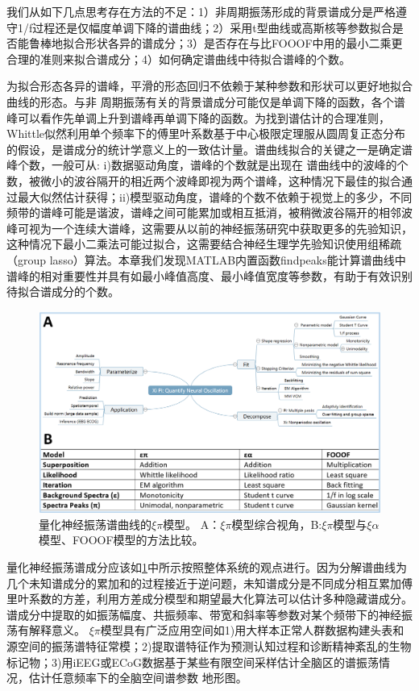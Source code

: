 我们从如下几点思考存在方法的不足：1）非周期振荡形成的背景谱成分是严格遵守1/f过程还是仅幅度单调下降的谱曲线；2）采用t型曲线或高斯核等参数拟合是否能鲁棒地拟合形状各异的谱成分；3）是否存在与比FOOOF中用的最小二乘更合理的准则来拟合谱成分；4）如何确定谱曲线中待拟合谱峰的个数。

为拟合形态各异的谱峰，平滑的形态回归不依赖于某种参数和形状可以更好地拟合曲线的形态。与非
周期振荡有关的背景谱成分可能仅是单调下降的函数，各个谱峰可以看作先单调上升到谱峰再单调下降的函数。为找到谱估计的合理准则，Whittle似然利用单个频率下的傅里叶系数基于中心极限定理服从圆周复正态分布的假设，是谱成分的统计学意义上的一致估计量。谱曲线拟合的关键之一是确定谱峰个数，一般可从: i)数据驱动角度，谱峰的个数就是出现在
谱曲线中的波峰的个数，被微小的波谷隔开的相近两个波峰即视为两个谱峰，这种情况下最佳的拟合通过最大似然估计获得；ii)模型驱动角度，谱峰的个数不依赖于视觉上的多少，不同频带的谱峰可能是谐波，谱峰之间可能累加或相互抵消，被稍微波谷隔开的相邻波峰可视为一个连续大谱峰，这需要从以前的神经振荡研究中获取更多的先验知识，这种情况下最小二乘法可能过拟合，这需要结合神经生理学先验知识使用组稀疏（group lasso）算法。本章我们发现MATLAB内置函数findpeaks能计算谱曲线中谱峰的相对重要性并具有如最小峰值高度、最小峰值宽度等参数，有助于有效识别待拟合谱成分的个数。

\begin{figure}[!h]
\includegraphics[width=15cm]{pic/xipi/model.png}
\caption{量化神经振荡谱曲线的$\xi\pi$模型。 A：$\xi\pi$模型综合视角，B:$\xi\pi$模型与$\xi\alpha$模型、FOOOF模型的方法比较。}
\label{model}
\end{figure}

量化神经振荡谱成分应该如\ref{model}中所示按照整体系统的观点进行。因为分解谱曲线为几个未知谱成分的累加和的过程接近于逆问题，未知谱成分是不同成分相互累加傅里叶系数的方差，利用方差成分模型和期望最大化算法可以估计多种隐藏谱成分。谱成分中提取的如振荡幅度、共振频率、带宽和斜率等参数对某个频带下的神经振荡有解释意义。
$\xi\pi$模型具有广泛应用空间如1)用大样本正常人群数据构建头表和源空间的振荡谱特征常模；2)提取谱特征作为预测认知过程和诊断精神紊乱的生物标记物；3)用iEEG或ECoG数据基于某些有限空间采样估计全脑区的谱振荡情况，估计任意频率下的全脑空间谱参数
地形图。

